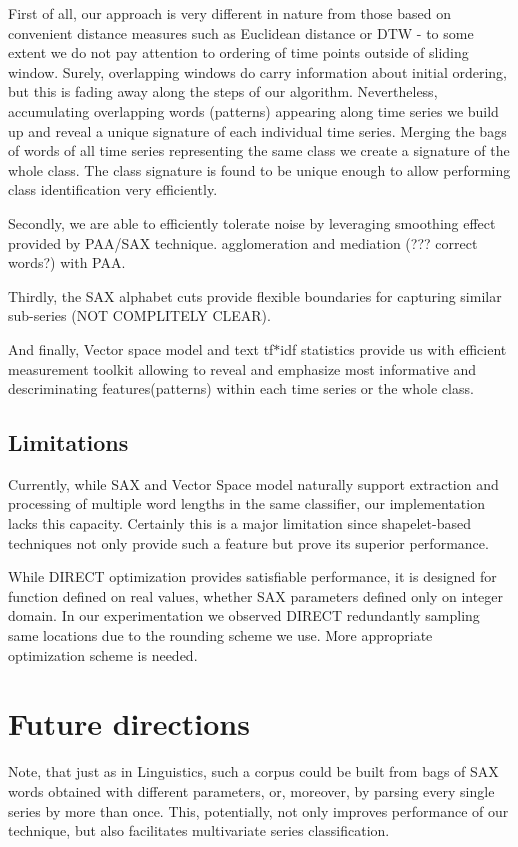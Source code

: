 \documentclass{llncs}
\begin{document}
First of all, our approach is very different in nature from those 
based on convenient distance measures such as Euclidean distance or DTW - to some 
extent we do not pay attention to ordering of time points outside of sliding window. 
Surely, overlapping windows do carry information about initial ordering, but this 
is fading away along the steps of our algorithm. Nevertheless, accumulating overlapping words (patterns) appearing along time series we build up and reveal a unique signature of each individual time series. Merging the bags of words of all time series representing the same class we create a signature of the whole class.  The class signature is found to be unique enough to allow performing class identification very efficiently.    

Secondly, we are able to efficiently tolerate noise by leveraging smoothing effect provided by PAA/SAX technique.     agglomeration and mediation (??? correct words?)  with PAA.

Thirdly, the SAX alphabet cuts provide flexible boundaries for capturing similar 
sub-series (NOT COMPLITELY CLEAR).

And finally, Vector space model and text {tf$\ast$idf} statistics provide us 
with efficient measurement toolkit allowing to reveal and emphasize most informative and descriminating features(patterns) within each time series or the whole class.       

\subsection{Limitations}
Currently, while SAX and Vector Space model naturally support extraction and processing of multiple
word lengths in the same classifier, our implementation lacks this capacity. Certainly this is a
major limitation since shapelet-based techniques \cite{bagnal} not only provide such a feature
but prove its superior performance.

While DIRECT optimization provides satisfiable performance, it is designed for function
defined on real values, whether SAX parameters defined only on integer domain. In our
experimentation we observed DIRECT redundantly sampling same locations due to the rounding scheme
we use. More appropriate optimization scheme is needed.


\section{Future directions}
Note, that just as in Linguistics, such a corpus could be built from bags of SAX words obtained with
different parameters, or, moreover, by parsing every single series by more than once. This,
potentially, not only improves performance of our technique, but also facilitates multivariate
series classification.
\end{document}
